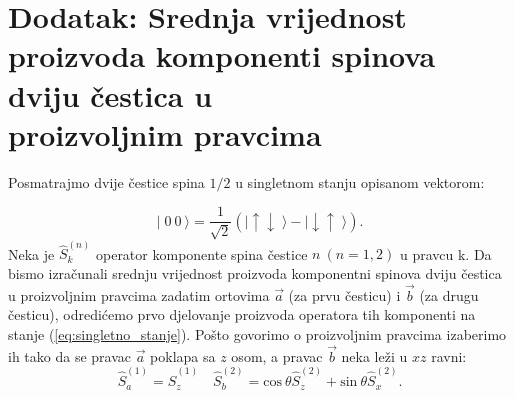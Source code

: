 \appendix
\chapter*{Dodatak: Srednja vrijednost proizvoda komponenti spinova dviju \v cestica u \\ proizvoljnim pravcima}
\setcounter{chapter}{4} \setcounter{equation}{0}

Posmatrajmo dvije čestice spina $1/2$ u singletnom stanju opisanom vektorom:

\begin{equation}
    | \;\! 0 \:\! 0 \:\! \rangle = \frac{1}{\sqrt2}(| \! \uparrow\downarrow \;\! \rangle - | \! \downarrow\uparrow \;\! \rangle) \label{eq:singletno_stanje}.
\end{equation}
Neka je $\hat{S}_k^{(n)}$ operator komponente spina čestice $n \ (n = 1, 2)$ u pravcu k. Da bismo izračunali srednju vrijednost proizvoda komponentni spinova dviju čestica u proizvoljnim pravcima zadatim ortovima $\vec{a}$ (za prvu česticu) i $\vec{b}$ (za drugu česticu), odredićemo prvo djelovanje proizvoda operatora tih komponenti na stanje (\ref{eq:singletno_stanje}).
Pošto govorimo o proizvoljnim pravcima izaberimo ih tako da se pravac $\vec{a}$ poklapa sa $z$ osom, a pravac $\vec{b}$ neka leži u $xz$ ravni:
\begin{equation*}
    \hat{S}_a^{(1)} = \hat{S}_z^{(1)} \quad \hat{S}_b^{(2)} = \mathrm{cos} \:\! \theta \hat{S}_z^{(2)} + \mathrm{sin} \:\! \theta \hat{S}_x^{(2)}.
\end{equation*}



